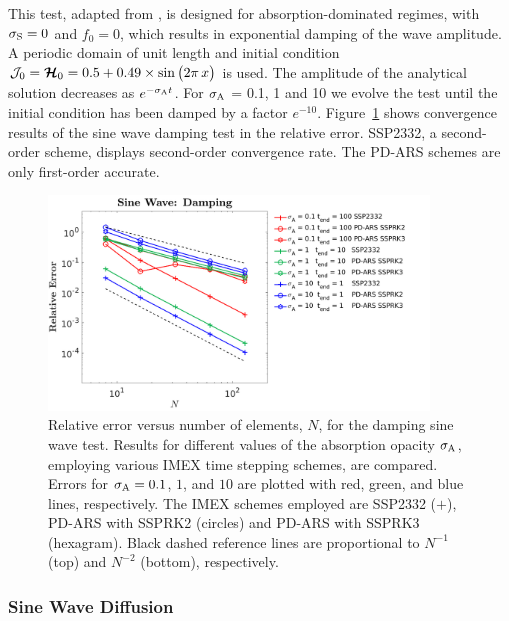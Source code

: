 This test, adapted from \cite{skinnerOstriker_2013}, is designed for absorption-dominated regimes, with $\sigma_{{\rm S}} = 0$ and $f_0 = 0$, which results in exponential damping of the wave amplitude.
A periodic domain of unit length and initial condition $\mathcal{J}_{0} = \boldsymbol{\mathcal{H}}_{0} = 0.5+0.49\times\sin\big(2\pi\,x\big)$ is used.
The amplitude of the analytical solution decreases as $e^{-\sigma_{{\rm A}} t}$.
For $\sigma_{{\rm A}}$ = 0.1, 1 and 10 we evolve the test until the initial condition has been damped by a factor $e^{-10}$. 
Figure~\ref{fig:SineWaveDamping} shows convergence results of the sine wave damping test in the relative error.
SSP2332, a second-order scheme, displays second-order convergence rate.  
The PD-ARS schemes are only first-order accurate.  
\begin{figure}[h]
  \centering
    \includegraphics[width=0.9\textwidth]{figures/SineWaveDamping}
   \caption{Relative error versus number of elements, $N$, for the damping sine wave test. Results for different values of the absorption opacity $\sigma_{{\rm A}}$, employing various IMEX time stepping schemes, are compared.  Errors for $\sigma_{{\rm A}}=0.1$, $1$, and $10$ are plotted with red, green, and blue lines, respectively.  The IMEX schemes employed are SSP2332 ($+$), PD-ARS with SSPRK2 (circles) and PD-ARS with SSPRK3 (hexagram).  Black dashed reference lines are proportional to $N^{-1}$ (top) and $N^{-2}$ (bottom), respectively.}
  \label{fig:SineWaveDamping}
\end{figure}

\subsubsection{Sine Wave Diffusion}

